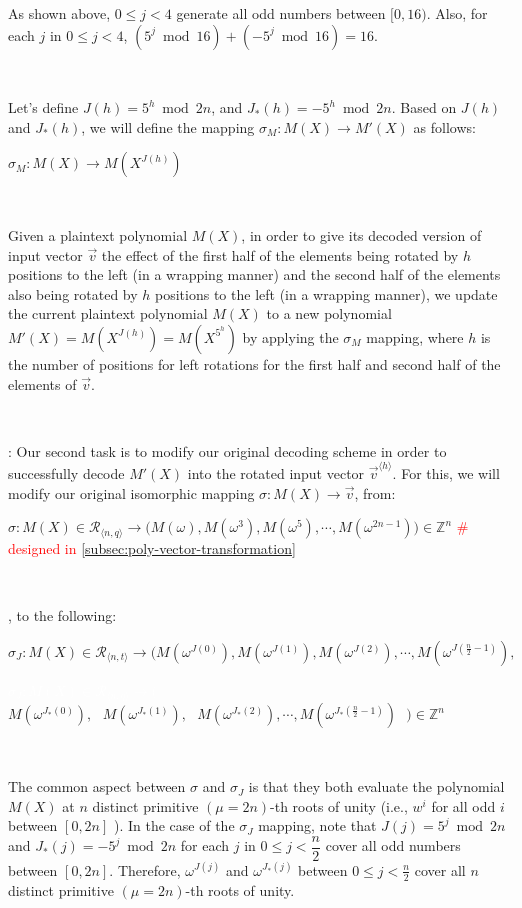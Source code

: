 As shown above, $0 \leq j < 4$ generate all odd numbers between $[0, 16)$. Also, for each $j$ in $0 \leq j < 4$, $(5^j \bmod 16) + (-5^j \bmod 16) = 16$. 

$ $

Let's define $J(h) = 5^h \bmod 2n$, \text{ } and \text{ } $J_*(h) = -5^h \bmod 2n$. Based on $J(h)$ and $J_*(h)$, we will define the mapping $\sigma_M : M(X) \rightarrow M'(X)$ as follows:

$\sigma_{M} : M(X) \rightarrow M(X^{J(h)})$

$ $

Given a plaintext polynomial $M(X)$, in order to give its decoded version of input vector $\vec{v}$ the effect of the first half of the elements being rotated by $h$ positions to the left (in a wrapping manner) and the second half of the elements also being rotated by $h$ positions to the left (in a wrapping manner), we update the current plaintext polynomial $M(X)$ to a new polynomial $M'(X) = M(X^{J(h)}) = M(X^{5^h})$ by applying the $\sigma_M$ mapping, where $h$ is the number of positions for left rotations for the first half and second half of the elements of $\vec{v}$. 


$ $

: Our second task is to modify our original decoding scheme in order to successfully decode $M'(X)$ into the rotated input vector $\vec{v}^{\langle h \rangle}$. For this, we will modify our original isomorphic mapping $\sigma : M(X) \longrightarrow \vec{v}$, from:

$\sigma: M(X) \in \mathcal{R}_{\langle n, q \rangle} \longrightarrow  \bm{(}M(\omega), M(\omega^3),M(\omega^5), \cdots, M(\omega^{2n-1})\bm{)} \in \mathbb{Z}^n$ \textcolor{red}{ \text{ } \# designed in \autoref{subsec:poly-vector-transformation}}

$ $

, to the following: 

$\sigma_J: M(X) \in \mathcal{R}_{\langle n, t \rangle} \longrightarrow  \bm{(}M(\omega^{J(0)}),M(\omega^{J(1)}),M(\omega^{J(2)}), \cdots, M(\omega^{J(\frac{n}{2} - 1)}), $

\textcolor{white}{$\sigma_J: M(X) \in \mathcal{R}_{\langle n, q \rangle} \longrightarrow  \bm{(}$} $M(\omega^{J_*(0)}), \text{ } M(\omega^{J_*(1)}), \text{ } M(\omega^{J_*(2)}), \cdots, M(\omega^{J_*(\frac{n}{2} - 1)}) \text{ } \bm{)} \in \mathbb{Z}^{n}$


$ $

The common aspect between $\sigma$ and $\sigma_J$ is that they both evaluate the polynomial $M(X)$ at $n$ distinct primitive $(\mu=2n)$-th roots of unity (i.e., $w^i$ for all odd $i$ between $[0,2n]$ ). In the case of the $\sigma_J$ mapping, note that $J(j) = 5^j \bmod 2n$ \text{ } and \text{ } $J_*(j) = -5^j \bmod 2n$ \text{ } for each $j$ in $0 \leq j < \dfrac{n}{2} $ \text{ }  cover all odd numbers between $[0, 2n]$. Therefore, $\omega^{J(j)}$ and $\omega^{J_*(j)}$ between $0 \leq j < \frac{n}{2}$ cover all $n$ distinct primitive $(\mu=2n)$-th roots of unity.

